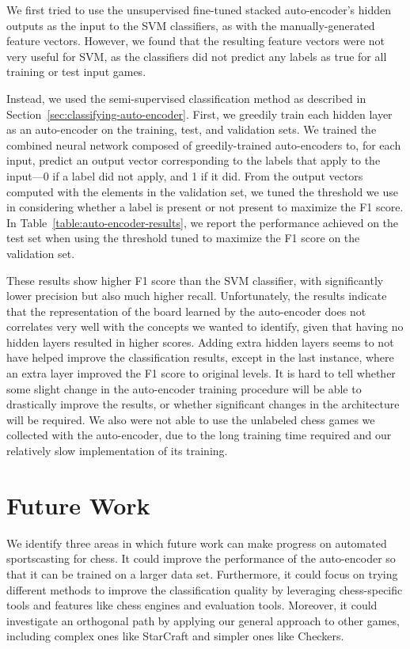 \documentclass[11pt]{article}
\begin{document}
We first tried to use the unsupervised fine-tuned stacked auto-encoder's hidden outputs as the input to the SVM classifiers, as with the manually-generated feature vectors. However, we found that the resulting feature vectors were not very useful for SVM, as the classifiers did not predict any labels as true for all training or test input games.

Instead, we used the semi-supervised classification method as described in Section~\ref{sec:classifying-auto-encoder}. First, we greedily train each hidden layer as an auto-encoder on the training, test, and validation sets. We trained the combined neural network composed of greedily-trained auto-encoders to, for each input, predict an output vector corresponding to the labels that apply to the input---0 if a label did not apply, and 1 if it did. From the output vectors computed with the elements in the validation set, we tuned the threshold we use in considering whether a label is present or not present to maximize the F1 score. In Table~\ref{table:auto-encoder-results}, we report the performance achieved on the test set when using the threshold tuned to maximize the F1 score on the validation set.

These results show higher F1 score than the SVM classifier, with significantly lower precision but also much higher recall. Unfortunately, the results indicate that the representation of the board learned by the auto-encoder does not correlates very well with the concepts we wanted to identify, given that having no hidden layers resulted in higher scores. Adding extra hidden layers seems to not have helped improve the classification results, except in the last instance, where an extra layer improved the F1 score to original levels. It is hard to tell whether some slight change in the auto-encoder training procedure will be able to drastically improve the results, or whether significant changes in the architecture will be required. We also were not able to use the unlabeled chess games we collected with the auto-encoder, due to the long training time required and our relatively slow implementation of its training.

\section{Future Work}
We identify three areas in which future work can make progress on automated sportscasting for chess. It could improve the performance of the auto-encoder so that it can be trained on a larger data set. Furthermore, it could focus on trying different methods to improve the classification quality by leveraging chess-specific tools and features like chess engines and evaluation tools. Moreover, it could investigate an orthogonal path by applying our general approach to other games, including complex ones like StarCraft and simpler ones like Checkers.
\end{document}
